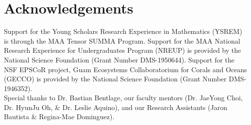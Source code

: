 \documentclass[12pt]{article}
\begin{document}
\section{Acknowledgements}
Support for the Young Scholars Research Experience in Mathematics (YSREM)  is through the MAA Tensor SUMMA Program. Support for the MAA National Research Experience for Undergraduates Program (NREUP) is provided by the National Science Foundation (Grant Number DMS-1950644). Support for the NSF EPSCoR project, Guam Ecosystems Collaboratorium for Corals and Oceans (GECCO) is provided by the National Science Foundation (Grant Number DMS-1946352).\\ 

Special thanks to Dr. Bastian Bentlage, our faculty mentors (Dr. JaeYong Choi, Dr. HyunJu Oh, \& Dr. Leslie Aquino), and our Research Assistants (Jaron Bautista \& Regina-Mae Dominguez).
\newpage
% 
% 
\printbibliography
\end{document}
